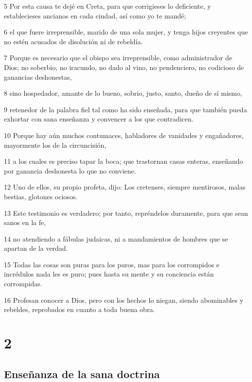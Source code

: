 \par 5 Por esta causa te dejé en Creta, para que corrigieses lo deficiente, y establecieses ancianos en cada ciudad, así como yo te mandé;
\par 6 el que fuere irreprensible, marido de una sola mujer, y tenga hijos creyentes que no estén acusados de disolución ni de rebeldía.
\par 7 Porque es necesario que el obispo sea irreprensible, como administrador de Dios; no soberbio, no iracundo, no dado al vino, no pendenciero, no codicioso de ganancias deshonestas,
\par 8 sino hospedador, amante de lo bueno, sobrio, justo, santo, dueño de sí mismo,
\par 9 retenedor de la palabra fiel tal como ha sido enseñada, para que también pueda exhortar con sana enseñanza y convencer a los que contradicen.
\par 10 Porque hay aún muchos contumaces, habladores de vanidades y engañadores, mayormente los de la circuncisión,
\par 11 a los cuales es preciso tapar la boca; que trastornan casas enteras, enseñando por ganancia deshonesta lo que no conviene.
\par 12 Uno de ellos, su propio profeta, dijo: Los cretenses, siempre mentirosos, malas bestias, glotones ociosos.
\par 13 Este testimonio es verdadero; por tanto, repréndelos duramente, para que sean sanos en la fe,
\par 14 no atendiendo a fábulas judaicas, ni a mandamientos de hombres que se apartan de la verdad.
\par 15 Todas las cosas son puras para los puros, mas para los corrompidos e incrédulos nada les es puro; pues hasta su mente y su conciencia están corrompidas.
\par 16 Profesan conocer a Dios, pero con los hechos lo niegan, siendo abominables y rebeldes, reprobados en cuanto a toda buena obra.

\chapter{2}

\section*{Enseñanza de la sana doctrina}

